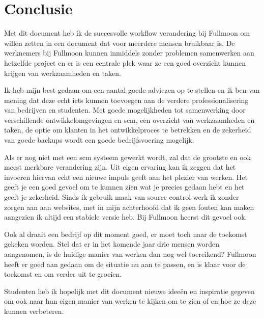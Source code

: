 \chapter{Conclusie}

Met dit document heb ik de succesvolle workflow verandering bij Fullmoon om willen zetten in een document dat voor meerdere mensen bruikbaar is. De werknemers bij Fullmoon kunnen inmiddels zonder problemen samenwerken aan hetzelfde project en er is een centrale plek waar ze een goed overzicht kunnen krijgen van werkzaamheden en taken.

Ik heb mijn best gedaan om een aantal goede adviezen op te stellen en ik ben van mening dat deze echt iets kunnen toevoegen aan de verdere professionalisering van bedrijven en studenten. Met goede mogelijkheden tot samenwerking door verschillende ontwikkelomgevingen en {\sc scm}, een overzicht van werkzaamheden en taken, de optie om klanten in het ontwikkelproces te betrekken en de zekerheid van goede backups wordt een goede bedrijfsvoering mogelijk.

Als er nog niet met een {\sc scm} systeem gewerkt wordt, zal dat de grootste en ook meest merkbare verandering zijn. Uit eigen ervaring kan ik zeggen dat het invoeren hiervan echt een nieuwe impuls geeft aan het plezier van werken. Het geeft je een goed gevoel om te kunnen zien wat je precies gedaan hebt en het geeft je zekerheid. Sinds ik gebruik maak van source control werk ik zonder zorgen aan aan websites, met in mijn achterhoofd dat ik geen fouten kan maken aangezien ik altijd een stabiele versie heb. Bij Fullmoon heerst dit gevoel ook.

Ook al draait een bedrijf op dit moment goed, er moet toch naar de toekomst gekeken worden. Stel dat er in het komende jaar drie mensen worden aangenomen, is de huidige manier van werken dan nog wel toereikend? Fullmoon heeft er goed aan gedaan om de situatie nu aan te passen, en is klaar voor de toekomst en om verder uit te groeien.

Studenten heb ik hopelijk met dit document nieuwe ideeën en inspiratie gegeven om ook naar hun eigen manier van werken te kijken om te zien of en hoe ze deze kunnen verbeteren.